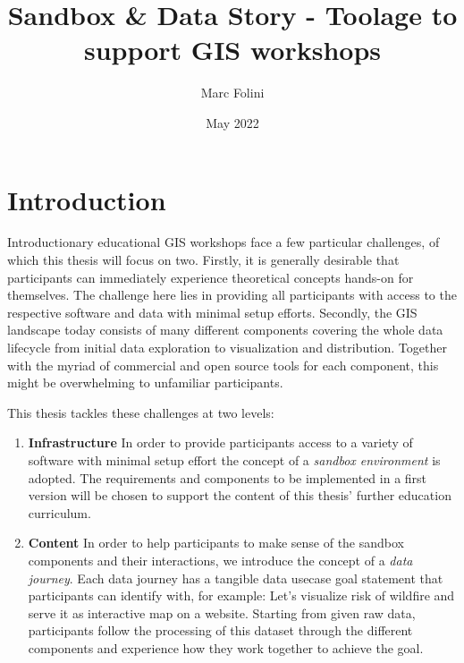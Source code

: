 \documentclass[12pt, letterpaper, twoside]{article}
\title{Sandbox \& Data Story - Toolage to support GIS workshops}
\author{Marc Folini}
\date{May 2022}
\begin{document}
\begin{titlepage}
  \setcounter{page}{1}
  \clearpage\maketitle
  \thispagestyle{empty}
  \vspace{2.5cm}
  \begin{abstract}
  \end{abstract}
\end{titlepage}

\newpage
\tableofcontents

\newpage
{}
\setcounter{page}{1}
\section{Introduction}
Introductionary educational GIS workshops face a few particular challenges, of which this thesis will focus on two.
Firstly, it is generally desirable that participants can immediately experience theoretical concepts hands-on for
themselves. The challenge here lies in providing all participants with access to the respective software and data with
minimal setup efforts. Secondly, the GIS landscape today consists of many different components covering the whole data
lifecycle from initial data exploration to visualization and distribution. Together with the myriad of commercial and
open source tools for each component, this might be overwhelming to unfamiliar participants.

This thesis tackles these challenges at two levels:
\begin{enumerate}
  \item \textbf{Infrastructure} In order to provide participants access to a variety of software with minimal setup
  effort the concept of a \emph{sandbox environment} is adopted. The requirements and components to be implemented in a
  first version will be chosen to support the content of this thesis' further education curriculum.
  \item \textbf{Content} In order to help participants to make sense of the sandbox components and their interactions,
  we introduce the concept of a \emph{data journey}. Each data journey has a tangible data usecase goal statement that
  participants can identify with, for example: Let's visualize risk of wildfire and serve it as interactive map on a
  website. Starting from given raw data, participants follow the processing of this dataset through the different
  components and experience how they work together to achieve the goal.
\end{enumerate}
\end{document}
